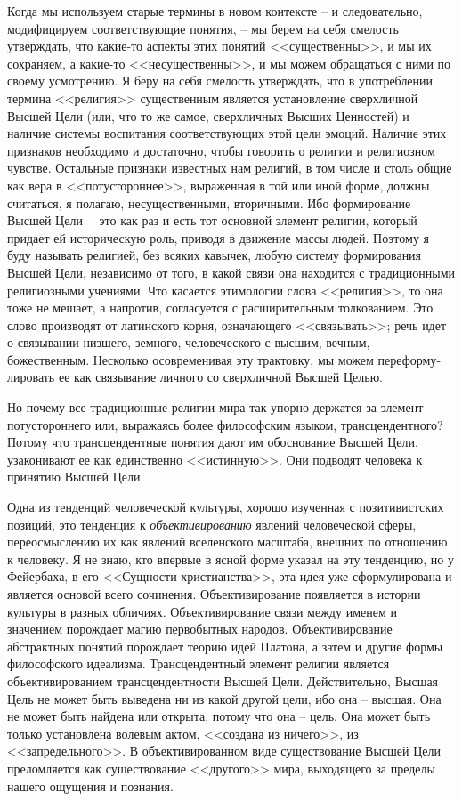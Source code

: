 \documentclass{book}
\begin{document}
Когда мы используем старые термины в новом контексте -- и следовательно, модифицируем соответствующие понятия, -- мы берем на себя смелость утверждать, что какие-то аспекты этих понятий <<существенны>>, и мы их сохраняем, а какие-то <<несущественны>>, и мы можем обращаться с ними по своему усмотрению. Я беру на себя смелость утверждать, что в упот­реблении термина <<религия>> существенным является установ­ление сверхличной Высшей Цели (или, что то же самое, сверх­личных Высших Ценностей) и наличие системы воспитания соответствующих этой цели эмоций. Наличие этих признаков необходимо и достаточно, чтобы говорить о религии и рели­гиозном чувстве. Остальные признаки известных нам религий, в том числе и столь общие как вера в <<потустороннее>>, выра­женная в той или иной форме, должны считаться, я полагаю, несущественными, вторичными. Ибо формирование Высшей Цели   это как раз и есть тот основной элемент религии, кото­рый придает ей историческую роль, приводя в движение массы людей. Поэтому я буду называть 
религией, без 
всяких кавычек, любую систему формирования Высшей Цели, независимо от то­го, в какой связи она находится с традиционными религиоз­ными учениями. Что касается этимологии слова <<религия>>, то она тоже не мешает, а напротив, согласуется с расширитель­ным толкованием. Это слово производят от латинского корня, означающего <<связывать>>; речь идет о связывании низшего, земного, человеческого с высшим, вечным, божественным. Не­сколько осовременивая эту трактовку, мы можем переформу­лировать ее как связывание личного со сверхличной Высшей Целью.

Но почему все традиционные религии мира так упорно держатся за элемент потустороннего или, выражаясь более философским языком, трансцендентного? Потому что трансцендентные понятия дают им обоснование Высшей Цели, узаконивают ее как единственно <<истинную>>. Они подводят человека к принятию Высшей Цели.

Одна из тенденций человеческой культуры, хорошо изучен­ная с позитивистских позиций, это тенденция к \textit{объективированию}  явлений человеческой сферы, переосмыслению их как яв­лений вселенского масштаба, внешних по отношению к чело­веку. Я не знаю, кто впервые в ясной форме указал на эту тен­денцию, но у Фейербаха, в его <<Сущности христианства>>, эта идея уже сформулирована и является основой всего сочинения. Объективирование появляется в истории культуры в разных обличиях. Объективирование связи между именем и значением порождает магию первобытных народов. Объективирование абстрактных понятий порождает теорию идей Платона, а затем и другие формы философского идеализма. Трансцендентный элемент религии является объективированием трансцендент­ности Высшей Цели. Действительно, Высшая Цель не может быть выведена ни из какой другой цели, ибо она -- высшая. Она не может быть найдена или открыта, потому что она -- цель. Она может быть только установлена волевым актом, <<создана из ничего>>, из 
<<запредельного>>. В 
объективирован­ном виде существование Высшей Цели преломляется как су­ществование <<другого>> мира, выходящего за пределы нашего ощущения и познания.
\end{document}
